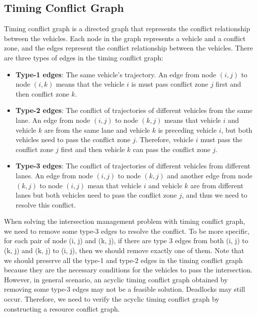 \documentclass{article}
\begin{document}
\begin{multicols*}{1}
    \subsection{Timing Conflict Graph}
    Timing conflict graph is a directed graph that represents the conflict relationship between the vehicles. Each node in the graph represents a vehicle and a conflict zone, and the edges represent the conflict relationship between the vehicles. There are three types of edges in the timing conflict graph:
    \begin{itemize}[itemsep=0pt, leftmargin=*]
        \item \textbf{Type-1 edges}: The same vehicle's trajectory. An edge from node $(i,j)$ to node $(i,k)$ means that the vehicle $i$ is must pass conflict zone $j$ first and then conflict zone $k$.
        \item \textbf{Type-2 edges}: The conflict of trajectories of different vehicles from the same lane. An edge from node $(i,j)$ to node $(k,j)$ means that vehicle $i$ and vehicle $k$ are from the same lane and vehicle $k$ is preceding vehicle $i$, but both vehicles need to pass the conflict zone $j$. Therefore, vehicle $i$ must pass the conflict zone $j$ first and then vehicle $k$ can pass the conflict zone $j$.
        \item \textbf{Type-3 edges}: The conflict of trajectories of different vehicles from different lanes. An edge from node $(i,j)$ to node $(k,j)$ and another edge from node $(k,j)$ to node $(i,j)$ mean that vehicle $i$ and vehicle $k$ are from different lanes but both vehicles need to pass the conflict zone $j$, and thus we need to resolve this conflict.
    \end{itemize}
    
    When solving the intersection management problem with timing conflict graph, we need to remove some type-3 edges to resolve the conflict. To be more specific, for each pair of node (i, j) and (k, j), if there are type 3 edges from both (i, j) to (k, j) and  (k, j) to (i, j), then we should remove exactly one of them. Note that we should preserve all the type-1 and type-2 edges in the timing conflict graph because they are the necessary conditions for the vehicles to pass the intersection. However, in general scenario, an acyclic timing conflict graph obtained by removing some type-3 edges may not be a feasible solution. Deadlocks may still occur. Therefore, we need to verify the acyclic timing conflict graph by constructing a resource conflict graph.
    

\end{multicols*}
\end{document}
